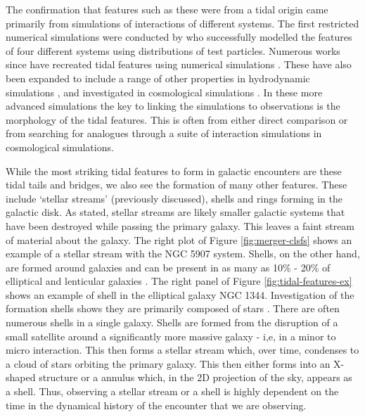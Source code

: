 The confirmation that features such as these were from a tidal origin came primarily from simulations of interactions of different systems. The first restricted numerical simulations were conducted by \citet{1972ApJ...178..623T} who successfully modelled the features of four different systems using distributions of test particles. Numerous works since have recreated tidal features using numerical simulations \citep{1993ApJ...410..586S, 2008AN....329.1046P, 2009AJ....137.3071B, 2016A&C....16...26W}. These have also been expanded to include a range of other properties in hydrodynamic simulations \citep{2013MNRAS.430.1901H, 2019MNRAS.485.1320M, 2021MNRAS.503.3113M, 2022MNRAS.509.2720S}, and investigated in cosmological simulations \citep{2015MNRAS.452.2845K, 2019MNRAS.490.2139R, 2020MNRAS.493.3716H, 2023RAA....23k5018D}. In these more advanced simulations the key to linking the simulations to observations is the morphology of the tidal features. This is often from either direct comparison or from searching for analogues through a suite of interaction simulations in cosmological simulations.

While the most striking tidal features to form in galactic encounters are these tidal tails and bridges, we also see the formation of many other features. These include `stellar streams' (previously discussed), shells and rings forming in the galactic disk. As stated, stellar streams are likely smaller galactic systems that have been destroyed while passing the primary galaxy. This leaves a faint stream of material about the galaxy. The right plot of Figure \ref{fig:merger-clsfs} shows an example of a stellar stream with the NGC 5907 system. Shells, on the other hand, are formed around galaxies and can be present in as many as 10\% - 20\% of elliptical and lenticular galaxies \citep{1983ApJ...274..534M, 2013ApJ...765...28A}. The right panel of Figure \ref{fig:tidal-features-ex} shows an example of shell in the elliptical galaxy NGC 1344. Investigation of the formation shells shows they are primarily composed of stars \citep{1984ApJ...279..596Q}. There are often numerous shells in a single galaxy. Shells are formed from the disruption of a small satellite around a significantly more massive galaxy - i,e, in a minor to micro interaction. This then forms a stellar stream which, over time, condenses to a cloud of stars orbiting the primary galaxy. This then either forms into an X-shaped structure or a annulus which, in the 2D projection of the sky, appears as a shell. Thus, observing a stellar stream or a shell is highly dependent on the time in the dynamical history of the encounter that we are observing.

